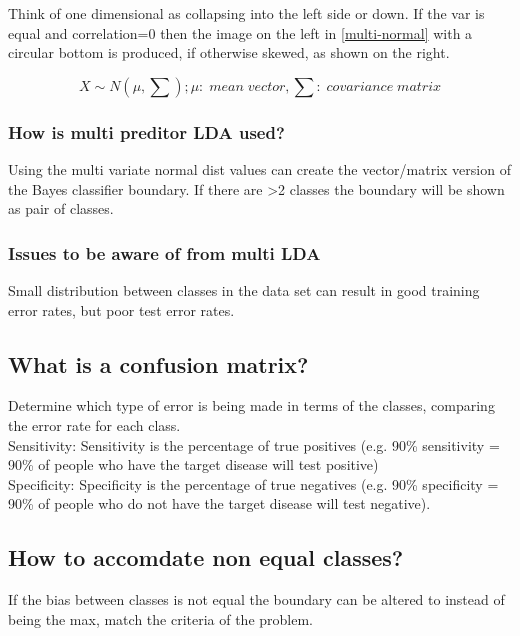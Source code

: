 \documentclass[11pt]{scrartcl} %
\begin{document}
Think of one dimensional as collapsing into the left side or down. If the var is equal and correlation=0
then the image on the left in \ref{multi-normal} with a circular bottom is produced, if otherwise skewed,
as shown on the right.

\begin{equation}
	X \sim N(\mu,\sum); \mu:\; mean\; vector, \sum:\; covariance\; matrix
\end{equation}

\subsubsection{How is multi preditor LDA used?}

Using the multi variate normal dist values can create the vector/matrix version of the Bayes 
classifier boundary. If there are >2 classes the boundary will be shown as pair of classes.

\subsubsection{Issues to be aware of from multi LDA}

Small distribution between classes in the data set can result in good training error rates, but 
poor test error rates.

\subsection{What is a confusion matrix?}

Determine which type of error is being made in terms of the classes, comparing the error rate for
each class.\\

Sensitivity: Sensitivity is the percentage of true positives (e.g. 90\% sensitivity = 90\% of people who have the target disease will test positive)\\
Specificity: Specificity is the percentage of true negatives (e.g. 90\% specificity = 90\% of people who do not have the target disease will test negative).

\subsection{How to accomdate non equal classes?}

If the bias between classes is not equal the boundary can be altered to instead of being the max,
match the criteria of the problem.
\end{document}
